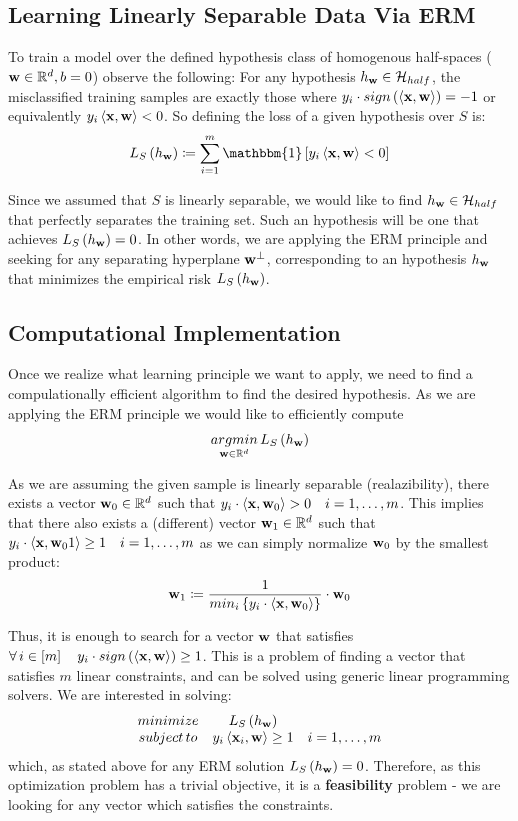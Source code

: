 \subsection{Learning Linearly Separable Data Via ERM}
To train a model over the defined hypothesis class of homogenous half-spaces ($\mathbf{w}\in\mathbb{R}^d, b=0$) observe the following: For any hypothesis $h_{\mathbf{w}}\in \mathcal{H}_{half}$, the misclassified training samples are exactly those where $y_i\cdot sign\left(\left\langle \mathbf{x},\mathbf{w}\right\rangle\right)=-1$ or equivalently $y_i\left\langle \mathbf{x},\mathbf{w}\right\rangle<0$. So defining the loss of a given hypothesis over $S$ is: $$ L_S\left(h_\w\right)\coloneqq\sum^m_{i=1}\mathbbm{1}\left[y_i\inprod{\x}{\w}<0\right] $$

Since we assumed that $S$ is linearly separable, we would like to find $h_{\mathbf{w}}\in\mathcal{H}_{half}$ that perfectly separates the training set. Such an hypothesis will be one that achieves $L_S\left(h_{\mathbf{w}}\right)=0$. In other words, we are applying the ERM principle and seeking for any separating hyperplane $\mathbf{w}^\perp$, corresponding to an hypothesis $h_{\mathbf{w}}$ that minimizes the empirical risk $L_S\left(h_{\mathbf{w}}\right)$.

\subsection{Computational Implementation}
Once we realize what learning principle we want to apply, we need to find a compulationally efficient algorithm to find the desired hypothesis. As we are applying the ERM principle we would like to efficiently compute $$ \underset{\mathbf{w}\in\mathbb{R}^d}{argmin}\,L_S\left(h_{\mathbf{w}}\right) $$

As we are assuming the given sample is linearly separable (realazibility), there exists a vector $\mathbf{w}_0\in\mathbb{R}^d$ such that $ y_i\cdot\left\langle \mathbf{x},\mathbf{w}_0\right\rangle>0\quad i=1,\ldots,m $. This implies that there also exists a (different) vector $\mathbf{w}_1\in\mathbb{R}^d$ such that $ y_i\cdot\left\langle \mathbf{x},\mathbf{w}_01\right\rangle\geq 1 \quad i=1,\ldots,m $ as we can simply normalize $\mathbf{w}_0$ by the smallest product: $$ \mathbf{w}_1 \coloneqq \frac{1}{min_i\left\{y_i\cdot \left\langle \mathbf{x},\mathbf{w}_0\right\rangle\right\}}\cdot \mathbf{w}_0 $$

Thus, it is enough to search for a vector $\mathbf{w}$ that satisfies $\forall\, i\in\left[m\right]\quad y_i\cdot sign\left(\left\langle \mathbf{x},\mathbf{w}\right\rangle\right)\geq 1$. This is a problem of finding a vector that satisfies $m$ linear constraints, and can be solved using generic linear programming solvers. We are interested in solving:
\begin{equation}
\begin{array}{ccc}
minimize & L_S\left(h_{\mathbf{w}}\right) & \\
subject \, to & y_i\left\langle \mathbf{x}_i,\mathbf{w}\right\rangle\geq 1 & i=1,\ldots,m\\
\end{array}
\label{eqn:half_space_opt}
\end{equation}
which, as stated above for any ERM solution $L_S\left(h_{\mathbf{w}}\right)=0$. Therefore, as this optimization problem has a trivial objective, it is a \textbf{feasibility} problem - we are looking for any vector which satisfies the constraints.

